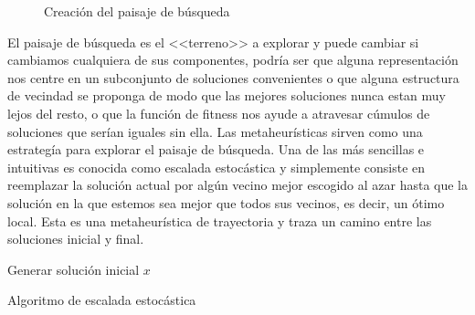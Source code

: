 \begin{figure}[H]
\caption{Creación del paisaje de búsqueda}
\end{figure}

El paisaje de búsqueda es el <<terreno>> a explorar y puede cambiar si cambiamos cualquiera de sus componentes, podría ser que alguna representación nos centre en un subconjunto de soluciones convenientes o que alguna estructura de vecindad se proponga de modo que las mejores soluciones nunca estan muy lejos del resto, o que la función de fitness nos ayude a atravesar cúmulos de soluciones que serían iguales sin ella. Las metaheurísticas sirven como una estrategía para explorar el paisaje de búsqueda. Una de las más sencillas e intuitivas es conocida como escalada estocástica y simplemente consiste en reemplazar la solución actual por algún vecino mejor escogido al azar hasta que la solución en la que estemos sea mejor que todos sus vecinos, es decir, un ótimo local. Esta es una metaheurística de trayectoria y traza un camino entre las soluciones inicial y final.

%
\begin{algorithm}[H]
 Generar solución inicial $x$\;
    \caption{Algoritmo de escalada estocástica}
\end{algorithm}


